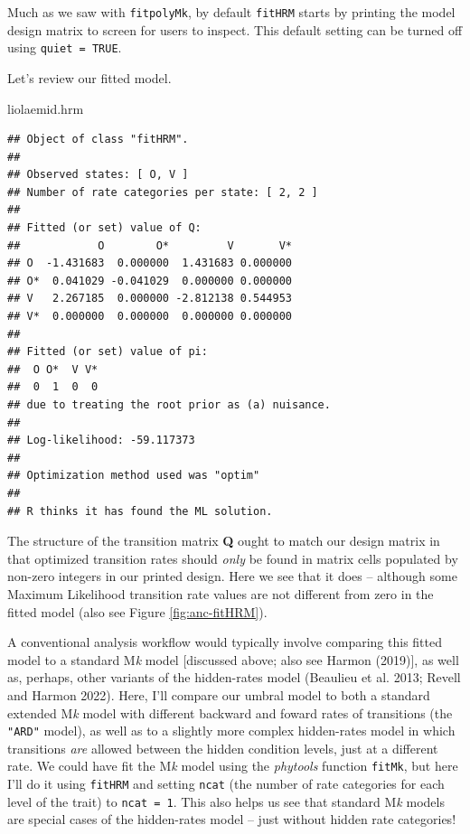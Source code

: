 \documentclass[fleqn,10pt,lineno]{wlpeerj} %
\newenvironment{Shaded}{\begin{snugshade}}{\end{snugshade}}
\newcommand{\NormalTok}[1]{#1}
\begin{document}
Much as we saw with \texttt{fitpolyMk}, by default \texttt{fitHRM} starts by printing the model design matrix to screen for users to inspect. This default setting can be turned off using \texttt{quiet\ =\ TRUE}.

Let's review our fitted model.

\begin{Shaded}
\begin{Highlighting}[]
\NormalTok{liolaemid.hrm}
\end{Highlighting}
\end{Shaded}

\begin{verbatim}
## Object of class "fitHRM".
## 
## Observed states: [ O, V ]
## Number of rate categories per state: [ 2, 2 ]
## 
## Fitted (or set) value of Q:
##            O        O*         V       V*
## O  -1.431683  0.000000  1.431683 0.000000
## O*  0.041029 -0.041029  0.000000 0.000000
## V   2.267185  0.000000 -2.812138 0.544953
## V*  0.000000  0.000000  0.000000 0.000000
## 
## Fitted (or set) value of pi:
##  O O*  V V* 
##  0  1  0  0 
## due to treating the root prior as (a) nuisance.
## 
## Log-likelihood: -59.117373 
## 
## Optimization method used was "optim"
## 
## R thinks it has found the ML solution.
\end{verbatim}

The structure of the transition matrix \textbf{Q} ought to match our design matrix in that optimized transition rates should \emph{only} be found in matrix cells populated by non-zero integers in our printed design. Here we see that it does -- although some Maximum Likelihood transition rate values are not different from zero in the fitted model (also see Figure \ref{fig:anc-fitHRM}).

A conventional analysis workflow would typically involve comparing this fitted model to a standard M\emph{k} model {[}discussed above; also see Harmon (2019){]}, as well as, perhaps, other variants of the hidden-rates model (Beaulieu et al. 2013; Revell and Harmon 2022). Here, I'll compare our umbral model to both a standard extended M\emph{k} model with different backward and foward rates of transitions (the \texttt{"ARD"} model), as well as to a slightly more complex hidden-rates model in which transitions \emph{are} allowed between the hidden condition levels, just at a different rate. We could have fit the M\emph{k} model using the \emph{phytools} function \texttt{fitMk}, but here I'll do it using \texttt{fitHRM} and setting \texttt{ncat} (the number of rate categories for each level of the trait) to \texttt{ncat\ =\ 1}. This also helps us see that standard M\emph{k} models are special cases of the hidden-rates model -- just without hidden rate categories!
\end{document}
